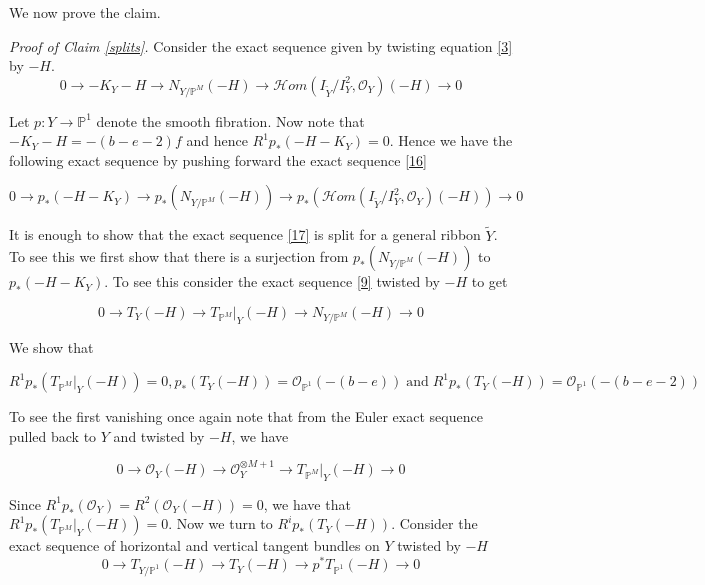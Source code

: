 \documentclass[11pt,twoside]{amsart}
\theoremstyle{plain}
\numberwithin{equation}{section}
\theoremstyle{definition}
\begin{document}
We now prove the claim.

\smallskip

\textit{Proof of Claim \ref{splits}.} Consider the exact sequence given by twisting equation \ref{3} by $-H$. 
\begin{equation}\label{16}
0 \to -K_Y-H \to N_{Y/\mathbb{P}^M}(-H) \to \mathcal{H}om(I_{\widetilde{Y}}/I_{Y}^2, \mathcal{O}_Y)(-H) \to 0
\end{equation}

Let $p: Y \to \mathbb{P}^1$ denote the smooth fibration. Now note that $-K_Y-H = -(b-e-2)f$ and hence $R^1p_*(-H-K_Y) = 0$. Hence we have the following exact sequence by pushing forward the exact sequence \ref{16}

\begin{equation}\label{17}
    0 \to p_*(-H-K_Y) \to p_*(N_{Y/\mathbb{P}^M}(-H)) \to p_*(\mathcal{H}om(I_{\widetilde{Y}}/I_{Y}^2, \mathcal{O}_Y)(-H)) \to 0
\end{equation}
    
It is enough to show that the exact sequence \ref{17} is split for a general ribbon $\widetilde{Y}$. To see this we first show that there is a surjection from $p_*(N_{Y/\mathbb{P}^M}(-H))$ to $p_*(-H-K_Y)$. To see this consider the exact sequence \ref{9} twisted by $-H$ to get 

\begin{equation}\label{18}
   0 \to T_Y(-H) \to T_{\mathbb{P}^M}|_Y(-H) \to N_{Y/\mathbb{P}^M}(-H) \to 0 
\end{equation}

We show that

\begin{equation*}
   R^1p_*(T_{\mathbb{P}^M}|_Y(-H)) = 0, p_*(T_Y(-H)) = \mathcal{O}_{\mathbb{P}^1}(-(b-e)) \operatorname{and} R^1p_*(T_Y(-H)) =  \mathcal{O}_{\mathbb{P}^1}(-(b-e-2))  
\end{equation*}

To see the first vanishing once again note that from the Euler exact sequence pulled back to $Y$ and twisted by $-H$, we have 

\begin{equation}\label{24}
    0 \to \mathcal{O}_Y(-H) \to \mathcal{O}_Y^{\otimes M+1} \to T_{\mathbb{P}^M}|_Y(-H) \to 0
\end{equation}

Since $R^1p_*(\mathcal{O}_Y) = R^2(\mathcal{O}_Y(-H)) = 0$, we have that $R^1p_*(T_{\mathbb{P}^M}|_Y(-H)) = 0$. Now we turn to $R^ip_*(T_Y(-H))$. Consider the exact sequence of horizontal and vertical tangent bundles on $Y$ twisted by $-H$
\begin{equation}\label{19}
    0 \to T_{Y/\mathbb{P}^1}(-H) \to T_Y(-H) \to p^*T_{\mathbb{P}^1}(-H) \to 0
\end{equation}
\end{document}
